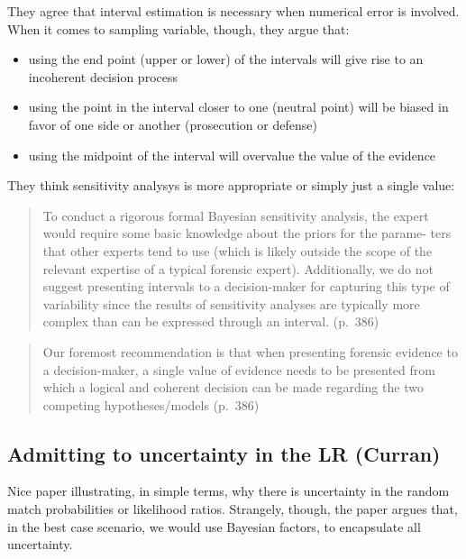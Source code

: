 \documentclass[
  10pt,
  dvipsnames,enabledeprecatedfontcommands]{scrartcl}
\begin{document}
They agree that interval estimation is necessary when numerical error is
involved. When it comes to sampling variable, though, they argue that:

\begin{itemize}
\item
  using the end point (upper or lower) of the intervals will give rise
  to an incoherent decision process
\item
  using the point in the interval closer to one (neutral point) will be
  biased in favor of one side or another (prosecution or defense)
\item
  using the midpoint of the interval will overvalue the value of the
  evidence
\end{itemize}

They think sensitivity analysys is more appropriate or simply just a
single value:

\begin{quote}
To conduct a rigorous formal Bayesian sensitivity analysis, the expert
would require some basic knowledge about the priors for the parame- ters
that other experts tend to use (which is likely outside the scope of the
relevant expertise of a typical forensic expert). Additionally, we do
not suggest presenting intervals to a decision-maker for capturing this
type of variability since the results of sensitivity analyses are
typically more complex than can be expressed through an interval.
(p.~386)
\end{quote}

\begin{quote}
Our foremost recommendation is that when presenting forensic evidence to
a decision-maker, a single value of evidence needs to be presented from
which a logical and coherent decision can be made regarding the two
competing hypotheses/models (p.~386)
\end{quote}

\hypertarget{admitting-to-uncertainty-in-the-lr-curran}{%
\subsection{Admitting to uncertainty in the LR
(Curran)}\label{admitting-to-uncertainty-in-the-lr-curran}}

Nice paper illustrating, in simple terms, why there is uncertainty in
the random match probabilities or likelihood ratios. Strangely, though,
the paper argues that, in the best case scenario, we would use Bayesian
factors, to encapsulate all uncertainty.
\end{document}
